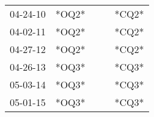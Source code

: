 \begin{supertabular}{lllll}
 04-24-10 &  *OQ2* &   &   &  *CQ2* \\
 04-02-11 &  *OQ2* &   &   &  *CQ2* \\
 04-27-12 &  *OQ2* &   &   &  *CQ2* \\
 04-26-13 &  *OQ3* &   &   &  *CQ3* \\
 05-03-14 &  *OQ3* &   &   &  *CQ3* \\
 05-01-15 &  *OQ3* &   &   &  *CQ3* \\
\end{supertabular}
